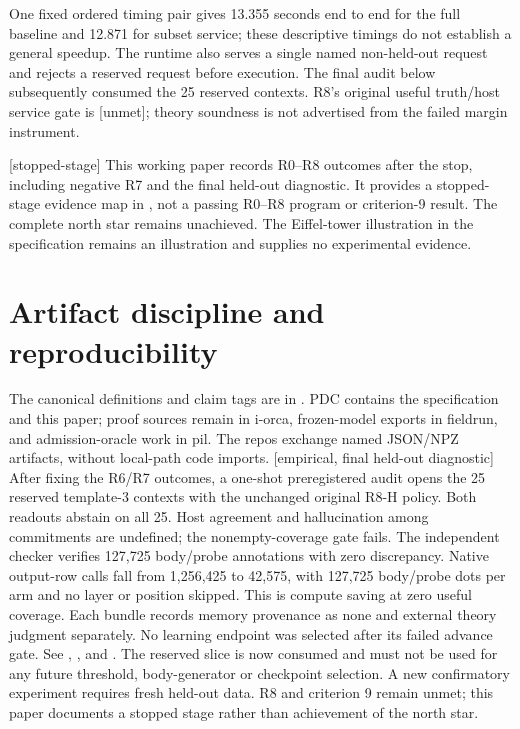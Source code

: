 \documentclass[11pt]{article}
\newcommand{\status}[1]{\textsf{[#1]}}
\begin{document}
One fixed ordered timing pair gives 13.355 seconds end to end for the full
baseline and 12.871 for subset service; these descriptive timings do not
establish a general speedup. The runtime also serves a single named
non-held-out request and rejects a reserved request before execution.
The final audit below subsequently consumed the 25 reserved contexts. R8's original useful
truth/host service gate is \status{unmet}; theory soundness is not advertised
from the failed margin instrument.

\status{stopped-stage} This working paper records R0--R8 outcomes after the stop, including
negative R7 and the final held-out diagnostic. It provides a stopped-stage
evidence map in , not a passing R0--R8 program
or criterion-9 result. The complete north star remains
unachieved. The Eiffel-tower illustration in the specification remains an
illustration and supplies no experimental evidence.

\section{Artifact discipline and reproducibility}

The canonical definitions and claim tags are in .
PDC contains the specification and this paper; proof sources remain in
i-orca, frozen-model exports in fieldrun, and admission-oracle work in pil.
The repos exchange named JSON/NPZ artifacts, without local-path code imports.
\status{empirical, final held-out diagnostic} After fixing the R6/R7
outcomes, a one-shot preregistered audit opens the 25 reserved template-3
contexts with the unchanged original R8-H policy. Both readouts abstain
on all 25. Host agreement and hallucination among commitments are undefined;
the nonempty-coverage gate fails. The independent checker verifies 127,725
body/probe annotations with zero discrepancy. Native output-row calls
fall from 1,256,425 to 42,575, with 127,725 body/probe dots per arm and no
layer or position skipped. This is compute saving at zero useful coverage.
Each bundle records memory provenance as none and external theory judgment
separately. No learning endpoint was selected after its failed advance gate.
See ,
, and .
The reserved slice is now consumed and must not be used for any future
threshold, body-generator or checkpoint selection. A new confirmatory
experiment requires fresh held-out data. R8 and criterion 9 remain unmet; this
paper documents a stopped stage rather than achievement of the north star.
\end{document}
